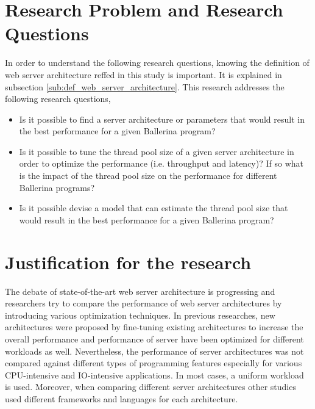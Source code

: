 \newpage

\section{Research Problem and Research Questions}\label{sec:research_questions}
 
 In order to understand the following research questions, knowing the definition of web server architecture reffed in this study is important. It is explained in subsection \ref{sub:def_web_server_architecture}. This research addresses the following research questions,

\begin{itemize}
	
 	
 	\item Is it possible to find a server architecture or parameters that would result in the best performance for a given Ballerina program? 
 	\item Is it possible to tune the thread pool size of a given server architecture in order to optimize the performance (i.e. throughput and latency)? If so what is the impact of the thread pool size on the performance for different Ballerina programs? 
 	\item Is it possible devise a model that can estimate the thread pool size that would result in the best performance for a given Ballerina program?
\end{itemize}




\section{Justification for the research}
 
 The debate of state-of-the-art web server architecture is progressing and researchers try to compare the performance of web server architectures by introducing various optimization techniques. In previous researches, new architectures were proposed by fine-tuning existing architectures to increase the overall performance and performance of server have been optimized for different workloads as well. Nevertheless, the performance of server architectures was not compared against different types of programming features especially for various CPU-intensive and IO-intensive applications. In most cases, a uniform workload is used. Moreover, when comparing different server architectures other studies used different frameworks and languages for each architecture.
 
